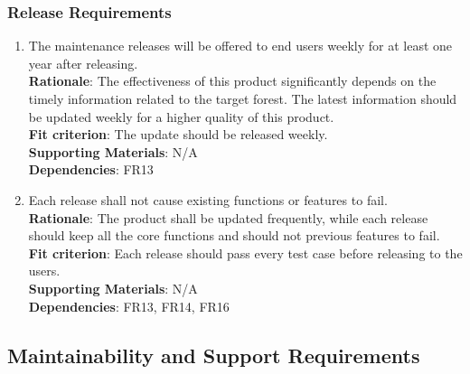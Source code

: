 \documentclass{article}
\begin{document}
\subsubsection{Release Requirements}
\begin{enumerate}[OE4.1]
    \item The maintenance releases will be offered to end users weekly for at least one year after releasing.\\
    \textbf{Rationale}: The effectiveness of this product significantly depends on the timely information related to the target forest. The latest information should be updated weekly for a higher quality of this product.\\
    \textbf{Fit criterion}: The update should be released weekly.\\
\textbf{Supporting Materials}: N/A\\
\textbf{Dependencies}: FR13\\
    
    \item Each release shall not cause existing functions or features 
    to fail. \\
    \textbf{Rationale}: The product shall be updated frequently, while each release should keep all the core functions and should not previous features to fail.\\
    \textbf{Fit criterion}: Each release should 
     pass every test case before releasing to the users.\\
\textbf{Supporting Materials}: N/A\\
\textbf{Dependencies}: FR13, FR14, FR16\\
    
  
\end{enumerate}
\subsection{Maintainability and Support Requirements}
\end{document}
